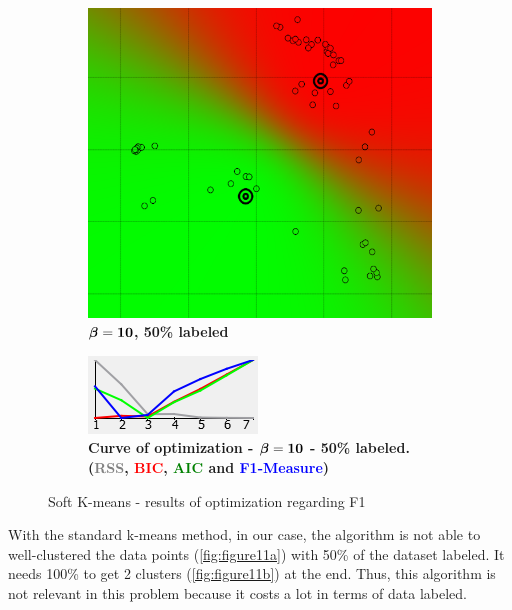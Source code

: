 \begin{figure}[!h]
\begin{subfigure}[h]{0.25\textwidth}
    \includegraphics[height=0.08\textheight]{./clustering/opt_F1_50__soft_k__beta_10_range7.png}
	\caption{$\boldsymbol \beta \bf = 10$\bf, 50\% labeled}
    \label{fig:figure10b}
    \end{subfigure}
    \hspace{20mm}
    \begin{subfigure}[h]{0.50\textwidth}
    \centering
    \includegraphics[height=0.08\textheight]{./clustering/curve_opt_F1_50__soft_k__beta_10_range7.png}
	\caption{\bf Curve of optimization - $\boldsymbol \beta \bf = 10$ - 50\% labeled. (\textcolor{gray}{RSS}, \textcolor{red}{BIC}, \textcolor{green}{AIC} and \textcolor{blue}{F1-Measure})}
    \label{fig:figure10d}
    \end{subfigure}
\caption{Soft K-means - results of optimization regarding F1}
\label{fig:figure10}
\end{figure}

With the standard k-means method, in our case, the algorithm is not able to well-clustered the data points (\ref{fig:figure11a}) with 50\% of the dataset labeled. It needs 100\% to get 2 clusters (\ref{fig:figure11b}) at the end. Thus, this algorithm is not relevant in this problem because it costs a lot in terms of data labeled. 

